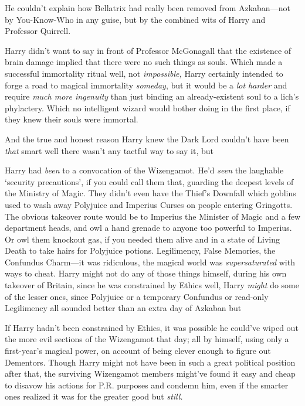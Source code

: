 He couldn't explain how Bellatrix had really been removed from Azkaban—not by
You-Know-Who in any guise, but by the combined wits of Harry and Professor
Quirrell.

Harry didn't want to say in front of Professor McGonagall that the existence of
brain damage implied that there were no such things as souls. Which made a
successful immortality ritual{\el} well, not \emph{impossible,} Harry
certainly intended to forge a road to magical immortality \emph{someday}, but
it would be a \emph{lot harder} and require \emph{much more ingenuity} than
just binding an already-existent soul to a lich's phylactery. Which no
intelligent wizard would bother doing in the first place, if they knew their
souls were immortal.

And the true and honest reason Harry knew the Dark Lord couldn't have been
\emph{that} smart{\el} well{\el} there wasn't any tactful way to say it,
but{\el}

Harry had \emph{been} to a convocation of the Wizengamot. He'd \emph{seen} the
laughable `security precautions', if you could call them that, guarding the
deepest levels of the Ministry of Magic. They didn't even have the Thief's
Downfall which goblins used to wash away Polyjuice and Imperius Curses on
people entering Gringotts. The obvious takeover route would be to Imperius the
Minister of Magic and a few department heads, and owl a hand grenade to anyone
too powerful to Imperius. Or owl them knockout gas, if you needed them alive
and in a state of Living Death to take hairs for Polyjuice potions.
Legilimency, False Memories, the Confundus Charm—it was ridiculous, the
magical world was \emph{supersaturated} with ways to cheat. Harry might not do
any of those things himself, during his own takeover of Britain, since he was
constrained by Ethics{\el} well, Harry \emph{might} do some of the lesser
ones, since Polyjuice or a temporary Confundus or read-only Legilimency all
sounded better than an extra day of Azkaban{\el} but{\el}

If Harry hadn't been constrained by Ethics, it was possible he could've wiped
out the more evil sections of the Wizengamot that day; all by himself, using only
a first-year's magical power, on account of being clever enough to figure out
Dementors. Though Harry might not have been in such a great political position
after that, the surviving Wizengamot members might've found it easy and cheap
to disavow his actions for P.R. purposes and condemn him, even if the smarter
ones realized it was for the greater good{\el} but \emph{still.}

